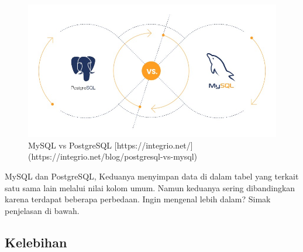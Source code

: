 \documentclass[
]{book}
\begin{document}
\begin{figure}

{\centering \includegraphics[width=1\linewidth]{./images/Bab1/MySQL-VS-PostgreSQL} 

}

\caption{MySQL vs PostgreSQL [https://integrio.net/](https://integrio.net/blog/postgresql-vs-mysql)}\label{fig:MySQL-VS-PostgreSQL}
\end{figure}

MySQL dan PostgreSQL, Keduanya menyimpan data di dalam tabel yang terkait satu sama lain melalui nilai kolom umum. Namun keduanya sering dibandingkan karena terdapat beberapa perbedaan. Ingin mengenal lebih dalam? Simak penjelasan di bawah.

\hypertarget{kelebihan}{%
\subsection{Kelebihan}\label{kelebihan}}
\end{document}
